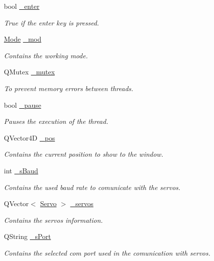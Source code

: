 \begin{DoxyCompactItemize}
bool \hyperlink{a00009_a5a3c1e2c09b76890790458b9d0469714}{\+\_\+enter}
\begin{DoxyCompactList}\small\item\em True if the enter key is pressed. \end{DoxyCompactList}\item 
\hyperlink{a00009_a8d581034e60792a9995d44065f6140a5}{Mode} \hyperlink{a00009_acdecea1688594d3ab7386a6db97dd90d}{\+\_\+mod}
\begin{DoxyCompactList}\small\item\em Contains the working mode. \end{DoxyCompactList}\item 
Q\+Mutex \hyperlink{a00009_a6327eafc0dac189ec1b202d63ef32457}{\+\_\+mutex}
\begin{DoxyCompactList}\small\item\em To prevent memory errors between threads. \end{DoxyCompactList}\item 
bool \hyperlink{a00009_aaf2ef80e8e43518b75d20a5102970d2e}{\+\_\+pause}
\begin{DoxyCompactList}\small\item\em Pauses the execution of the thread. \end{DoxyCompactList}\item 
Q\+Vector4\+D \hyperlink{a00009_a6ad7cef9e9ac7454399871260e3693d4}{\+\_\+pos}
\begin{DoxyCompactList}\small\item\em Contains the current position to show to the window. \end{DoxyCompactList}\item 
int \hyperlink{a00009_a5b9a41b9e271275b914affb0a845a2ee}{\+\_\+s\+Baud}
\begin{DoxyCompactList}\small\item\em Contains the used baud rate to comunicate with the servos. \end{DoxyCompactList}\item 
Q\+Vector$<$ \hyperlink{a00007}{Servo} $>$ \hyperlink{a00009_a1ac6662fe6d198b5971ae0ffa7ddfcfd}{\+\_\+servos}
\begin{DoxyCompactList}\small\item\em Contains the servos information. \end{DoxyCompactList}\item 
Q\+String \hyperlink{a00009_ac9a614aa1518efb49b0a06636bd1bdbf}{\+\_\+s\+Port}
\begin{DoxyCompactList}\small\item\em Contains the selected com port used in the comunication with servos. \end{DoxyCompactList}\item 

\end{DoxyCompactItemize}
